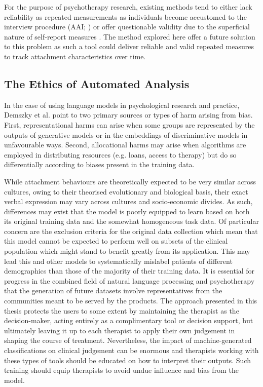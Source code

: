 \documentclass[12pt]{report}
\begin{document}
For the purpose of psychotherapy research, existing methods tend to either lack reliability as repeated measurements as individuals become accustomed to the interview procedure (AAI; ) or offer questionable validity due to the superficial nature of self-report measures \cite{Talia2017}.
The method explored here offer a future solution to this problem as such a tool could deliver reliable and valid repeated measures to track attachment characteristics over time.

\subsection{The Ethics of Automated Analysis}
In the case of using language models in psychological research and practice, Demszky et al. \citeyear{Demszky2023} point to two primary sources or types of harm arising from bias.
First, representational harms can arise when some groups are represented by the outputs of generative models or in the embeddings of discriminative models in unfavourable ways.
Second, allocational harms may arise when algorithms are employed in distributing resources (e.g. loans, access to therapy) but do so differentially according to biases present in the training data.

While attachment behaviours are theoretically expected to be very similar across cultures, owing to their theorised evolutionary and biological basis, their exact verbal expression may vary across cultures and socio-economic divides.
As such, differences may exist that the model is poorly equipped to learn based on both its original training data and the somewhat homogeneous task data.
Of particular concern are the exclusion criteria for the original data collection \cite{Talia2017} which mean that this model cannot be expected to perform well on subsets of the clinical population which might stand to benefit greatly from its application.
This may lead this and other models to systematically mislabel patients of different demographics than those of the majority of their training data.
It is essential for progress in the combined field of natural language processing and psychotherapy that the generation of future datasets involve representatives from the communities meant to be served by the products.
The approach presented in this thesis protects the users to some extent by maintaining the therapist as the decision-maker, acting entirely as a complimentary tool or decision support, but ultimately leaving it up to each therapist to apply their own judgement in shaping the course of treatment.
Nevertheless, the impact of machine-generated classifications on clinical judgement can be enormous and therapists working with these types of tools should be educated on how to interpret their outputs.
Such training should equip therapists to avoid undue influence and bias from the model.
\end{document}
